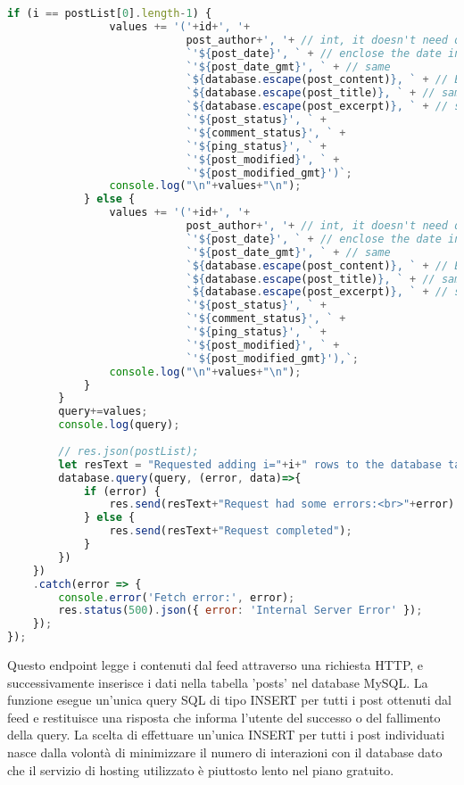 \documentclass{article}
\begin{document}
\begin{lstlisting}[language=JavaScript, caption={Implementazione dell'endpoint per sincronizzare il database con i post dal feed}, label={lst:syncDbEndpoint}]
            if (i == postList[0].length-1) {
                values += '('+id+', '+
                            post_author+', '+ // int, it doesn't need quotes
                            `'${post_date}', ` + // enclose the date in single quotes
                            `'${post_date_gmt}', ` + // same
                            `${database.escape(post_content)}, ` + // Escape the post content
                            `${database.escape(post_title)}, ` + // same
                            `${database.escape(post_excerpt)}, ` + // same
                            `'${post_status}', ` +
                            `'${comment_status}', ` +
                            `'${ping_status}', ` +
                            `'${post_modified}', ` +
                            `'${post_modified_gmt}')`;
                console.log("\n"+values+"\n");
            } else {
                values += '('+id+', '+
                            post_author+', '+ // int, it doesn't need quotes
                            `'${post_date}', ` + // enclose the date in single quotes
                            `'${post_date_gmt}', ` + // same
                            `${database.escape(post_content)}, ` + // Escape the post content
                            `${database.escape(post_title)}, ` + // same
                            `${database.escape(post_excerpt)}, ` + // same
                            `'${post_status}', ` +
                            `'${comment_status}', ` +
                            `'${ping_status}', ` +
                            `'${post_modified}', ` +
                            `'${post_modified_gmt}'),`;
                console.log("\n"+values+"\n");
            }
        }
        query+=values;
        console.log(query);
        
        // res.json(postList);
        let resText = "Requested adding i="+i+" rows to the database table 'posts'.<br><br>";
        database.query(query, (error, data)=>{
            if (error) {
                res.send(resText+"Request had some errors:<br>"+error)
            } else {
                res.send(resText+"Request completed");
            }
        })
    })
    .catch(error => {
        console.error('Fetch error:', error);
        res.status(500).json({ error: 'Internal Server Error' });
    });
});
\end{lstlisting}

Questo endpoint legge i contenuti dal feed attraverso una richiesta HTTP, e successivamente inserisce i dati nella tabella 'posts' nel database MySQL. La funzione esegue un'unica query SQL di tipo INSERT per tutti i post ottenuti dal feed e restituisce una risposta che informa l'utente del successo o del fallimento della query.
La scelta di effettuare un'unica INSERT per tutti i post individuati nasce dalla volontà di minimizzare il numero di interazioni con il database dato che il servizio di hosting utilizzato è piuttosto lento nel piano gratuito.
\end{document}
